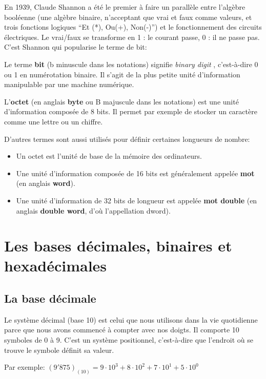\documentclass[11pt, a4paper]{book}
\begin{document}
En 1939, Claude Shannon a été le premier à faire un parallèle entre l'algèbre booléenne (une algèbre binaire, n'acceptant que vrai et faux comme valeurs, et trois fonctions logiques “Et (*), Ou(+), Non(-)”) et le fonctionnement des circuits électriques. Le vrai/faux se transforme en 1 : le courant passe, 0 : il ne passe pas. C'est Shannon qui popularise le terme de bit:

\begin{defi}
Le terme {\bf bit} (b minuscule dans les notations) signifie {\it binary digit }, c'est-à-dire 0 ou 1 en numérotation binaire. Il s'agit de la plus petite unité d'information manipulable par une machine numérique. 


L'{\bf octet} (en anglais {\bf byte} ou B majuscule dans les notations) est une unité d'information composée de 8 bits. Il permet par exemple de stocker un caractère comme une lettre ou un chiffre.
\end{defi}

D'autres termes sont aussi utilisés pour définir certaines longueurs de nombre:
\begin{itemize}
\item Un octet est l’unité de base de la mémoire des ordinateurs.
\item Une unité d'information composée de 16 bits est généralement appelée {\bf mot} (en anglais {\bf word}).

\item Une unité d'information de 32 bits de longueur est appelée {\bf mot double} (en anglais {\bf double word}, d'où l'appellation dword).
\end{itemize}


\section{Les bases décimales, binaires et hexadécimales}


\subsection{La base décimale}

Le système décimal (base 10) est celui que nous utilisons dans la vie quotidienne parce que nous avons commencé à compter avec nos doigts. Il comporte 10 symboles de 0 à 9. C'est un système positionnel, c'est-à-dire que l'endroit où se trouve le symbole définit sa valeur.

Par exemple: $(9'875)_{(10)}=9 \cdot 10^3 + 8 \cdot 10^2 + 7\cdot 10^1 + 5 \cdot 10^0$
\end{document}
